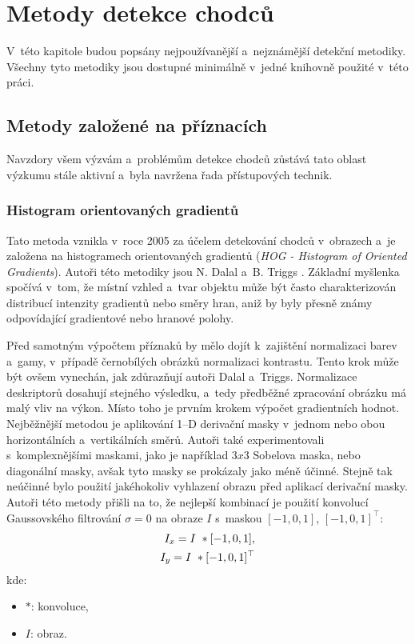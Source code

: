 \section{Metody detekce chodců}
V~této kapitole budou popsány nejpoužívanější a~nejznámější detekční metodiky. Všechny tyto metodiky jsou dostupné minimálně v~jedné knihovně použité v~této práci.  

\subsection{Metody založené na příznacích}
Navzdory všem výzvám a~problémům detekce chodců zůstává tato oblast výzkumu stále aktivní a~byla navržena řada přístupových technik.
\subsubsection*{Histogram orientovaných gradientů}
Tato metoda vznikla v~roce 2005 za účelem detekování chodců v~obrazech a~je založena na histogramech orientovaných gradientů (\textit{HOG - Histogram of Oriented Gradients}). Autoři této metodiky jsou N. Dalal a~B. Triggs \cite{hog:dalal}. Základní myšlenka spočívá v~tom, že místní vzhled a~tvar objektu může být často charakterizován distribucí intenzity gradientů nebo směry hran, aniž by byly přesně známy odpovídající gradientové nebo hranové polohy.  

Před samotným výpočtem příznaků by mělo dojít k~zajištění normalizaci barev a~gamy, v~případě černobílých obrázků normalizaci kontrastu. Tento krok může být ovšem vynechán, jak zdůrazňují autoři Dalal a~Triggs. Normalizace deskriptorů dosahují stejného výsledku, a~tedy předběžné zpracování obrázku má malý vliv na výkon. Místo toho je prvním krokem výpočet gradientních hodnot. Nejběžnější metodou je aplikování 1--D derivační masky v~jednom nebo obou horizontálních a~vertikálních směrů. Autoři také experimentovali s~komplexnějšími maskami, jako je například $3x3$ Sobelova maska, nebo diagonální masky, avšak tyto masky se prokázaly jako méně účinné. Stejně tak neúčinné bylo použití jakéhokoliv vyhlazení obrazu před aplikací derivační masky. Autoři této metody přišli na to, že nejlepší kombinací je použití konvolucí Gaussovského filtrování $\sigma = 0$ na obraze $I$ s~maskou $[-1, 0, 1]$, $[-1,0,1]^\top$:
\begin{equation*}
\centering
 \label{eq:hogMask}
 \begin{aligned}
I_x = I~* [-1, 0, 1], \\
I_y = I~* [-1, 0, 1]^\top
 \end{aligned}
\end{equation*}
kde:
\begin{itemize}[label=]
  \item $*$: konvoluce,
  \item $I$: obraz.
\end{itemize}

